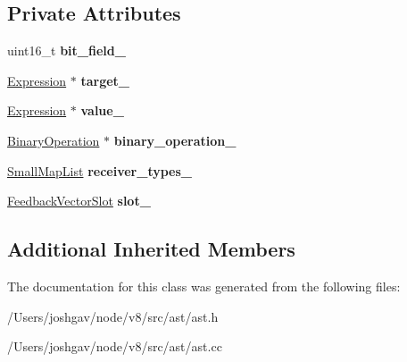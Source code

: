 \subsection*{Private Attributes}
\begin{DoxyCompactItemize}
\item 
uint16\+\_\+t {\bfseries bit\+\_\+field\+\_\+}\hypertarget{classv8_1_1internal_1_1_assignment_a3399b357581259f0c3a1f2de6f1542ca}{}\label{classv8_1_1internal_1_1_assignment_a3399b357581259f0c3a1f2de6f1542ca}

\item 
\hyperlink{classv8_1_1internal_1_1_expression}{Expression} $\ast$ {\bfseries target\+\_\+}\hypertarget{classv8_1_1internal_1_1_assignment_a32703a85f1c097275d14a7e8567de95b}{}\label{classv8_1_1internal_1_1_assignment_a32703a85f1c097275d14a7e8567de95b}

\item 
\hyperlink{classv8_1_1internal_1_1_expression}{Expression} $\ast$ {\bfseries value\+\_\+}\hypertarget{classv8_1_1internal_1_1_assignment_a54952963cd41fb8eb216d81eb760ea7b}{}\label{classv8_1_1internal_1_1_assignment_a54952963cd41fb8eb216d81eb760ea7b}

\item 
\hyperlink{classv8_1_1internal_1_1_binary_operation}{Binary\+Operation} $\ast$ {\bfseries binary\+\_\+operation\+\_\+}\hypertarget{classv8_1_1internal_1_1_assignment_a3cc55741d1df948e7ebd250ab36d9bee}{}\label{classv8_1_1internal_1_1_assignment_a3cc55741d1df948e7ebd250ab36d9bee}

\item 
\hyperlink{classv8_1_1internal_1_1_small_map_list}{Small\+Map\+List} {\bfseries receiver\+\_\+types\+\_\+}\hypertarget{classv8_1_1internal_1_1_assignment_a24e545cb91d2948dc7584211fcf366e9}{}\label{classv8_1_1internal_1_1_assignment_a24e545cb91d2948dc7584211fcf366e9}

\item 
\hyperlink{classv8_1_1internal_1_1_feedback_vector_slot}{Feedback\+Vector\+Slot} {\bfseries slot\+\_\+}\hypertarget{classv8_1_1internal_1_1_assignment_a4651f2a180160c0e9140d24ff12e4102}{}\label{classv8_1_1internal_1_1_assignment_a4651f2a180160c0e9140d24ff12e4102}

\end{DoxyCompactItemize}
\subsection*{Additional Inherited Members}


The documentation for this class was generated from the following files\+:\begin{DoxyCompactItemize}
\item 
/\+Users/joshgav/node/v8/src/ast/ast.\+h\item 
/\+Users/joshgav/node/v8/src/ast/ast.\+cc\end{DoxyCompactItemize}
